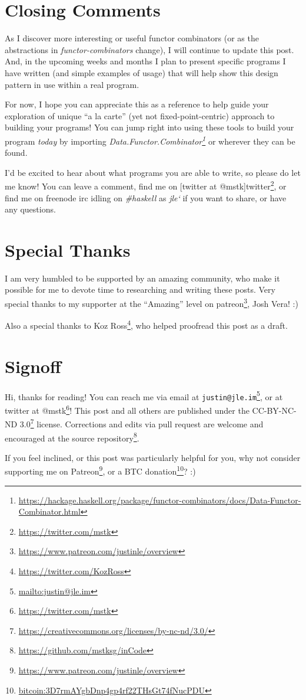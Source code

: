 \documentclass[]{article}
\renewcommand{\href}[2]{#2\footnote{\url{#1}}}
\begin{document}
\hypertarget{closing-comments}{%
\section{Closing Comments}\label{closing-comments}}

As I discover more interesting or useful functor combinators (or as the
abstractions in \emph{functor-combinators} change), I will continue to update
this post. And, in the upcoming weeks and months I plan to present specific
programs I have written (and simple examples of usage) that will help show this
design pattern in use within a real program.

For now, I hope you can appreciate this as a reference to help guide your
exploration of unique ``a la carte'' (yet not fixed-point-centric) approach to
building your programs! You can jump right into using these tools to build your
program \emph{today} by importing
\emph{\href{https://hackage.haskell.org/package/functor-combinators/docs/Data-Functor-Combinator.html}{Data.Functor.Combinator}}
or wherever they can be found.

I'd be excited to hear about what programs you are able to write, so please do
let me know! You can leave a comment, find me on {[}twitter at
@mstk{]}\href{https://twitter.com/mstk}{twitter}, or find me on freenode irc
idling on \emph{\#haskell} as \emph{jle`} if you want to share, or have any
questions.

\hypertarget{special-thanks}{%
\section{Special Thanks}\label{special-thanks}}

I am very humbled to be supported by an amazing community, who make it possible
for me to devote time to researching and writing these posts. Very special
thanks to my supporter at the ``Amazing'' level on
\href{https://www.patreon.com/justinle/overview}{patreon}, Josh Vera! :)

Also a special thanks to \href{https://twitter.com/KozRoss}{Koz Ross}, who
helped proofread this post as a draft.

\hypertarget{signoff}{%
\section{Signoff}\label{signoff}}

Hi, thanks for reading! You can reach me via email at
\href{mailto:justin@jle.im}{\nolinkurl{justin@jle.im}}, or at twitter at
\href{https://twitter.com/mstk}{@mstk}! This post and all others are published
under the \href{https://creativecommons.org/licenses/by-nc-nd/3.0/}{CC-BY-NC-ND
3.0} license. Corrections and edits via pull request are welcome and encouraged
at \href{https://github.com/mstksg/inCode}{the source repository}.

If you feel inclined, or this post was particularly helpful for you, why not
consider \href{https://www.patreon.com/justinle/overview}{supporting me on
Patreon}, or a \href{bitcoin:3D7rmAYgbDnp4gp4rf22THsGt74fNucPDU}{BTC donation}?
:)
\end{document}
